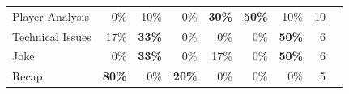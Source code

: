\begin{table}[htbp]
\begin{tabular}{lrrrrrrrr}
    Player Analysis                   & 0\%                                                                            & 10\%                                                                      & 0\%                                                                           & \textbf{30\%}                                                                          & \textbf{50\%}                                                                            & 10\%                                                                                                 & 10                                                                       \\
    Technical Issues                  & 17\%                                                                           & \textbf{33\%}                                                                      & 0\%                                                                           & 0\%                                                                           & 0\%                                                                             & \textbf{50\%}                                                                                                 & 6                                                                        \\
    Joke                              & 0\%                                                                            & \textbf{33\%}                                                                      & 0\%                                                                           & 17\%                                                                          & 0\%                                                                             & \textbf{50\%}                                                                                                 & 6                                                                        \\
    Recap                             & \textbf{80\%}                                                                           & 0\%                                                                       & \textbf{20\%}                                                                          & 0\%                                                                           & 0\%                                                                             & 0\%                                                                                                  & 5                                                                        \\

\end{tabular}
\end{table}
